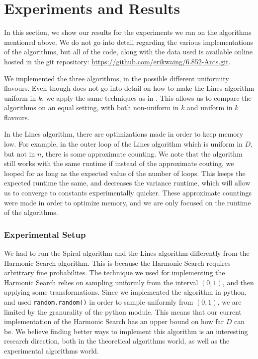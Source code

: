 \documentclass[runningheads,a4paper]{llncs}
\begin{document}
\section{Experiments and Results}
\label{experiments}

In this section, we show our results for the experiments we ran on the algorithms mentioned above. We do not go into detail regarding the various implementations of the algorithms, but all of the code, along with the data used is available online hosted in the git repository: \url{https://github.com/erikwaing/6.852-Ants.git}. 

We implemented the three algorithms, in the possible different uniformity flavours. Even though \cite{lenzen2014trade} does not go into detail on how to make the Lines algorithm uniform in $k$, we apply the same techniques as in \cite{feinerman2012collaborative}. This allows us to compare the algorithms on an equal setting, with both non-uniform in $k$ and uniform in $k$ flavours. 

In the Lines algorithm, there are optimizations made in order to keep memory low. For example, in the outer loop of the Lines algorithm which is uniform in $D$, but not in $n$, there is some approximate counting. We note that the algorithm still works with the same runtime if instead of the approximate couting, we looped for as long as the expected value of the number of loops. This keeps the expected runtime the same, and decreases the variance runtime, which will allow us to converge to constants experimentally quicker. These approximate countings were made in order to optimize memory, and we are only focused on the runtime of the algorithms.

\subsubsection{Experimental Setup}

We had to run the Spiral algorithm and the Lines algorithm differently from the Harmonic Search algorithm. This is because the Harmonic Search requires arbritrary fine probabilites. The technique we used for implementing the Harmonic Search relies on sampling uniformly from the interval $(0, 1)$, and then applying some transformations. Since we implemented the algorithm in python, and used \texttt{random.random()} in order to sample uniformly from $(0,1)$, we are limited by the granurality of the python module. This means that our current implementation of the Harmonic Search has an upper bound on how far $D$ can be. We believe finding better ways to implement this algorithm is an interesting research direction, both in the theoretical algorithms world, as well as the experimental algorithms world. 
\end{document}

